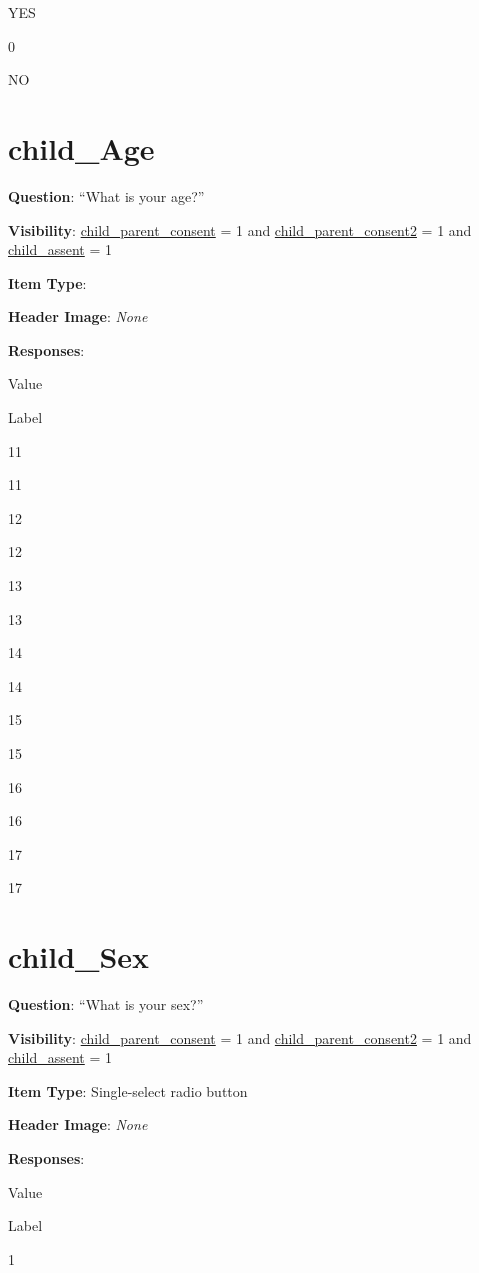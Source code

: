 \documentclass[]{book}
\begin{document}
YES

0

NO

\hypertarget{child_age}{%
\section{child\_Age}\label{child_age}}

\textbf{Question}: ``What is your age?''

\textbf{Visibility}: \protect\hyperlink{child_parent_consent}{child\_parent\_consent} = 1 and \protect\hyperlink{child_parent_consent2}{child\_parent\_consent2} = 1 and \protect\hyperlink{child_assent}{child\_assent} = 1

\textbf{Item Type}:

\textbf{Header Image}: \emph{None}

\textbf{Responses}:

Value

Label

11

11

12

12

13

13

14

14

15

15

16

16

17

17

\hypertarget{child_sex}{%
\section{child\_Sex}\label{child_sex}}

\textbf{Question}: ``What is your sex?''

\textbf{Visibility}: \protect\hyperlink{child_parent_consent}{child\_parent\_consent} = 1 and \protect\hyperlink{child_parent_consent2}{child\_parent\_consent2} = 1 and \protect\hyperlink{child_assent}{child\_assent} = 1

\textbf{Item Type}: Single-select radio button

\textbf{Header Image}: \emph{None}

\textbf{Responses}:

Value

Label

1
\end{document}
